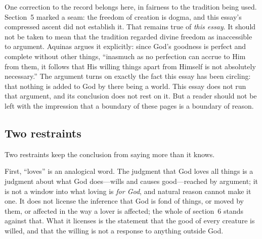 One correction to the record belongs here, in fairness to the tradition being used. Section~5 marked a seam: the freedom of creation is dogma, and this essay's compressed ascent did not establish it. That remains true of \emph{this essay}. It should not be taken to mean that the tradition regarded divine freedom as inaccessible to argument. Aquinas argues it explicitly: since God's goodness is perfect and complete without other things, ``inasmuch as no perfection can accrue to Him from them, it follows that His willing things apart from Himself is not absolutely necessary.'' The argument turns on exactly the fact this essay has been circling: that nothing is added to God by there being a world. This essay does not run that argument, and its conclusion does not rest on it. But a reader should not be left with the impression that a boundary of these pages is a boundary of reason.

\subsection{Two restraints}

Two restraints keep the conclusion from saying more than it knows.

First, ``loves'' is an analogical word. The judgment that God loves all things is a judgment about what God does---wills and causes good---reached by argument; it is not a window into what loving is \emph{for God}, and natural reason cannot make it one. It does not license the inference that God is fond of things, or moved by them, or affected in the way a lover is affected; the whole of section~6 stands against that. What it licenses is the statement that the good of every creature is willed, and that the willing is not a response to anything outside God.

